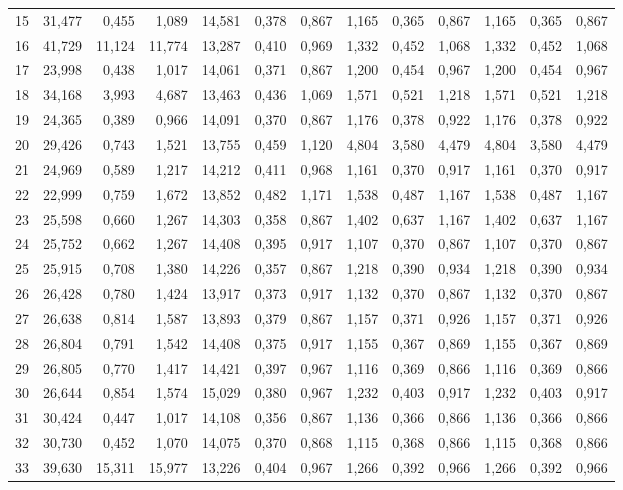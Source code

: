 \begin{longtable}{lrrrrrrrrrrrr}
15 & 31,477 & 0,455 & 1,089 & 14,581 & 0,378 & 0,867 & 1,165 & 0,365 & 0,867 & 1,165 & 0,365 & 0,867 \\
16 & 41,729 & 11,124 & 11,774 & 13,287 & 0,410 & 0,969 & 1,332 & 0,452 & 1,068 & 1,332 & 0,452 & 1,068 \\
17 & 23,998 & 0,438 & 1,017 & 14,061 & 0,371 & 0,867 & 1,200 & 0,454 & 0,967 & 1,200 & 0,454 & 0,967 \\
18 & 34,168 & 3,993 & 4,687 & 13,463 & 0,436 & 1,069 & 1,571 & 0,521 & 1,218 & 1,571 & 0,521 & 1,218 \\
19 & 24,365 & 0,389 & 0,966 & 14,091 & 0,370 & 0,867 & 1,176 & 0,378 & 0,922 & 1,176 & 0,378 & 0,922 \\
20 & 29,426 & 0,743 & 1,521 & 13,755 & 0,459 & 1,120 & 4,804 & 3,580 & 4,479 & 4,804 & 3,580 & 4,479 \\
21 & 24,969 & 0,589 & 1,217 & 14,212 & 0,411 & 0,968 & 1,161 & 0,370 & 0,917 & 1,161 & 0,370 & 0,917 \\
22 & 22,999 & 0,759 & 1,672 & 13,852 & 0,482 & 1,171 & 1,538 & 0,487 & 1,167 & 1,538 & 0,487 & 1,167 \\
23 & 25,598 & 0,660 & 1,267 & 14,303 & 0,358 & 0,867 & 1,402 & 0,637 & 1,167 & 1,402 & 0,637 & 1,167 \\
24 & 25,752 & 0,662 & 1,267 & 14,408 & 0,395 & 0,917 & 1,107 & 0,370 & 0,867 & 1,107 & 0,370 & 0,867 \\
25 & 25,915 & 0,708 & 1,380 & 14,226 & 0,357 & 0,867 & 1,218 & 0,390 & 0,934 & 1,218 & 0,390 & 0,934 \\
26 & 26,428 & 0,780 & 1,424 & 13,917 & 0,373 & 0,917 & 1,132 & 0,370 & 0,867 & 1,132 & 0,370 & 0,867 \\
27 & 26,638 & 0,814 & 1,587 & 13,893 & 0,379 & 0,867 & 1,157 & 0,371 & 0,926 & 1,157 & 0,371 & 0,926 \\
28 & 26,804 & 0,791 & 1,542 & 14,408 & 0,375 & 0,917 & 1,155 & 0,367 & 0,869 & 1,155 & 0,367 & 0,869 \\
29 & 26,805 & 0,770 & 1,417 & 14,421 & 0,397 & 0,967 & 1,116 & 0,369 & 0,866 & 1,116 & 0,369 & 0,866 \\
30 & 26,644 & 0,854 & 1,574 & 15,029 & 0,380 & 0,967 & 1,232 & 0,403 & 0,917 & 1,232 & 0,403 & 0,917 \\
31 & 30,424 & 0,447 & 1,017 & 14,108 & 0,356 & 0,867 & 1,136 & 0,366 & 0,866 & 1,136 & 0,366 & 0,866 \\
32 & 30,730 & 0,452 & 1,070 & 14,075 & 0,370 & 0,868 & 1,115 & 0,368 & 0,866 & 1,115 & 0,368 & 0,866 \\
33 & 39,630 & 15,311 & 15,977 & 13,226 & 0,404 & 0,967 & 1,266 & 0,392 & 0,966 & 1,266 & 0,392 & 0,966 \\

\end{longtable}
